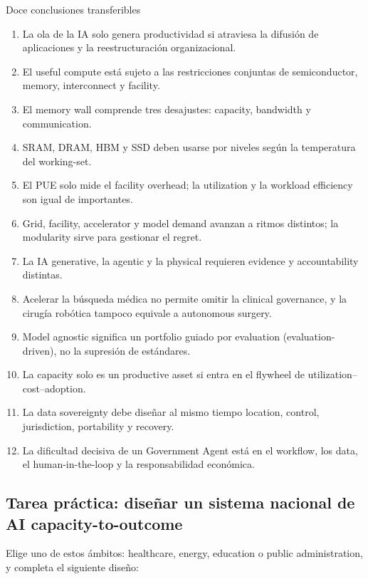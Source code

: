 \documentclass[a4paper]{article}
\begin{document}
\begin{importantbox}{Doce conclusiones transferibles}
\begin{enumerate}
  \item La ola de la IA solo genera productividad si atraviesa la difusión de aplicaciones y la reestructuración organizacional.
  \item El useful compute está sujeto a las restricciones conjuntas de semiconductor, memory, interconnect y facility.
  \item El memory wall comprende tres desajustes: capacity, bandwidth y communication.
  \item SRAM, DRAM, HBM y SSD deben usarse por niveles según la temperatura del working-set.
  \item El PUE solo mide el facility overhead; la utilization y la workload efficiency son igual de importantes.
  \item Grid, facility, accelerator y model demand avanzan a ritmos distintos; la modularity sirve para gestionar el regret.
  \item La IA generative, la agentic y la physical requieren evidence y accountability distintas.
  \item Acelerar la búsqueda médica no permite omitir la clinical governance, y la cirugía robótica tampoco equivale a autonomous surgery.
  \item Model agnostic significa un portfolio guiado por evaluation (evaluation-driven), no la supresión de estándares.
  \item La capacity solo es un productive asset si entra en el flywheel de utilization--cost--adoption.
  \item La data sovereignty debe diseñar al mismo tiempo location, control, jurisdiction, portability y recovery.
  \item La dificultad decisiva de un Government Agent está en el workflow, los data, el human-in-the-loop y la responsabilidad económica.
\end{enumerate}
\end{importantbox}

\subsection{Tarea práctica: diseñar un sistema nacional de AI capacity-to-outcome}

Elige uno de estos ámbitos: healthcare, energy, education o public administration, y completa el siguiente diseño:
\end{document}

